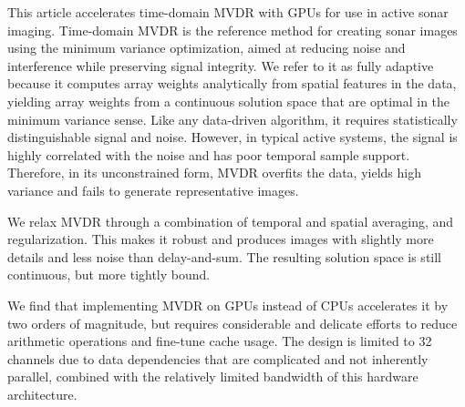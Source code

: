 This article accelerates time-domain MVDR with GPUs for use in active sonar imaging. Time-domain MVDR is the reference method for creating sonar images using the minimum variance optimization, aimed at reducing noise and interference while preserving signal integrity. We refer to it as fully adaptive because it computes array weights analytically from spatial features in the data, yielding array weights from a continuous solution space that are optimal in the minimum variance sense. Like any data-driven algorithm, it requires statistically distinguishable signal and noise. However, in typical active systems, the signal is highly correlated with the noise and has poor temporal sample support. Therefore, in its unconstrained form, MVDR overfits the data, yields high variance and fails to generate representative images.

We relax MVDR through a combination of temporal and spatial averaging, and regularization. This makes it robust and produces images with slightly more details and less noise than delay-and-sum. The resulting solution space is still continuous, but more tightly bound.

We find that implementing MVDR on GPUs instead of CPUs accelerates it by two orders of magnitude, but requires considerable and delicate efforts to reduce arithmetic operations and fine-tune cache usage. The design is limited to 32 channels due to data dependencies that are complicated and not inherently parallel, combined with the relatively limited bandwidth of this hardware architecture. 


%

